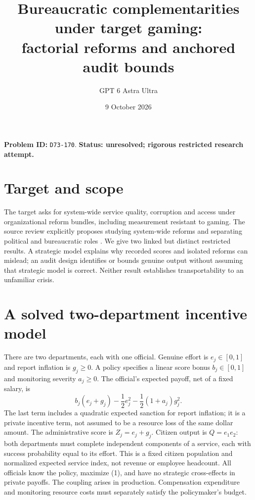 \documentclass[11pt]{article}
\title{Bureaucratic complementarities under target gaming:\\factorial reforms and anchored audit bounds}
\author{GPT 6 Astra Ultra}
\date{9 October 2026}
\begin{document}
\maketitle
\noindent\textbf{Problem ID:} \texttt{D73-170}. \textbf{Status: unresolved; rigorous restricted research attempt.}

\section{Target and scope}
The target asks for system-wide service quality, corruption and access
under organizational reform bundles, including measurement resistant to
gaming. The source review explicitly proposes studying system-wide reforms
and separating political and bureaucratic roles \cite{B}. We give two
linked but distinct restricted results. A strategic model explains why
recorded scores and isolated reforms can mislead; an audit design identifies
or bounds genuine output without assuming that strategic model is correct.
Neither result establishes transportability to an unfamiliar crisis.

\section{A solved two-department incentive model}
There are two departments, each with one official. Genuine effort is
$e_j\in[0,1]$ and report inflation is $g_j\geq0$. A policy specifies a
linear score bonus $b_j\in[0,1]$ and monitoring severity $a_j\geq0$.
The official's expected payoff, net of a fixed salary, is
\[
 b_j(e_j+g_j)-\frac12e_j^2-\frac12(1+a_j)g_j^2.                \tag{1}
\]
The last term includes a quadratic expected sanction for report inflation;
it is a private incentive term, not assumed to be a resource loss of the
same dollar amount. The administrative score is $Z_j=e_j+g_j$.
Citizen output is $Q=e_1e_2$: both departments must complete independent
components of a service, each with success probability equal to its effort.
This is a fixed citizen population and normalized expected service index,
not revenue or employee headcount. All officials know the policy, maximize
(1), and have no strategic cross-effects in private payoffs. The coupling
arises in production. Compensation expenditure and monitoring resource
costs must separately satisfy the policymaker's budget.
\end{document}
